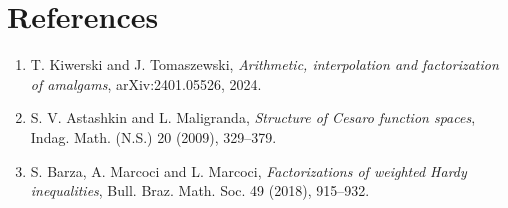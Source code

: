 \documentclass[11pt]{article}
\begin{document}
\section*{References}

\begin{enumerate}
\item T. Kiwerski and J. Tomaszewski, \emph{Arithmetic, interpolation and
factorization of amalgams}, arXiv:2401.05526, 2024.
\item S. V. Astashkin and L. Maligranda, \emph{Structure of Cesaro function
spaces}, Indag. Math. (N.S.) 20 (2009), 329--379.
\item S. Barza, A. Marcoci and L. Marcoci, \emph{Factorizations of weighted
Hardy inequalities}, Bull. Braz. Math. Soc. 49 (2018), 915--932.
\end{enumerate}
\end{document}
